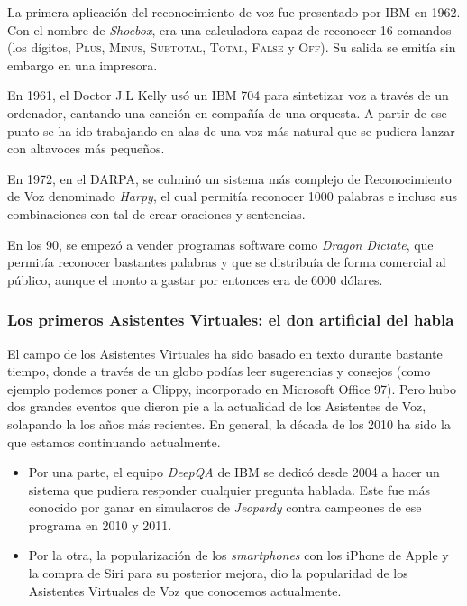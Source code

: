 La primera aplicación del reconocimiento de voz fue presentado por IBM en 1962. Con el nombre de \textit{Shoebox}, era una calculadora capaz de reconocer 16 comandos (los dígitos, \textsc{Plus}, \textsc{Minus}, \textsc{Subtotal}, \textsc{Total}, \textsc{False} y \textsc{Off}). Su salida se emitía sin embargo en una impresora.

En 1961, el Doctor J.L Kelly usó un IBM 704 para sintetizar voz a través de un ordenador, cantando una canción en compañía de una orquesta. A partir de ese punto se ha ido trabajando en alas de una voz más natural que se pudiera lanzar con altavoces más pequeños.

En 1972, en el DARPA, se culminó un sistema más complejo de Reconocimiento de Voz denominado \textit{Harpy}, el cual permitía reconocer 1000 palabras e incluso sus combinaciones con tal de crear oraciones y sentencias.

En los 90, se empezó a vender programas software como \textit{Dragon Dictate}, que permitía reconocer bastantes palabras y que se distribuía de forma comercial al público, aunque el monto a gastar por entonces era de 6000 dólares.

\subsubsection{Los primeros Asistentes Virtuales: el don artificial del habla}

El campo de los Asistentes Virtuales ha sido basado en texto durante bastante tiempo, donde a través de un globo podías leer sugerencias y consejos (como ejemplo podemos poner a Clippy, incorporado en 	Microsoft Office 97). Pero hubo dos grandes eventos que dieron pie a la actualidad de los Asistentes de Voz, solapando la los años más recientes. En general, la década de los 2010 ha sido la que estamos continuando actualmente.

\begin{itemize}
	\item Por una parte, el equipo \textit{DeepQA} de IBM se dedicó desde 2004 a hacer un sistema que pudiera responder cualquier pregunta hablada. Este fue más conocido por ganar en simulacros de \textit{Jeopardy} contra campeones de ese programa en 2010 y 2011.
	\item Por la otra, la popularización de los \textit{smartphones} con los iPhone de Apple y la compra de Siri para su posterior mejora, dio la popularidad de los Asistentes Virtuales de Voz que conocemos actualmente.
\end{itemize}

